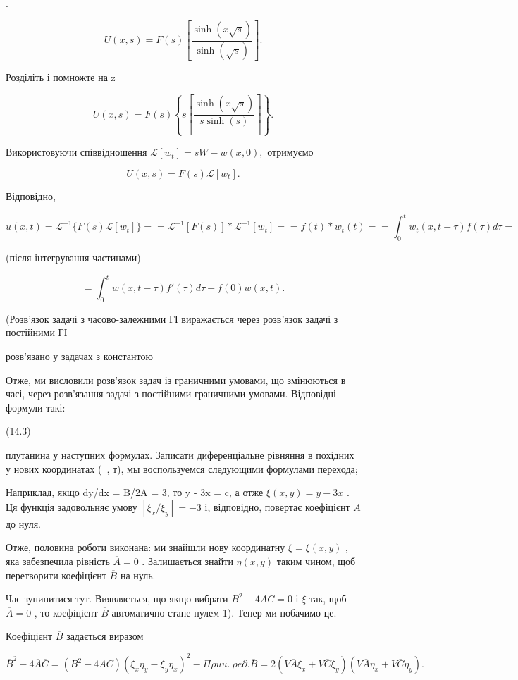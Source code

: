 \documentclass[
  ukrainian,
]{article}
\begin{document}
.

\[
U(x, s) = F(s) \left[ \frac{\sinh(x \sqrt{s})}{\sinh(\sqrt{s})} \right].
\]

Розділіть і помножте на z

\[
U(x, s) = F(s) \left\{ s \left[ \frac{\sinh(x \sqrt{s})}{s \sinh(s)} \right] \right\}.
\]

Використовуючи співвідношення \(\mathscr{L}[w_t] = sW - w(x, 0),\)
отримуємо

\[
U(x, s) = F(s) \mathcal{L}[w_t].
\]

Відповідно,

\[
u(x, t) = \mathcal{L}^{-1} \{ F(s) \mathcal{L}[w_t] \} =
= \mathcal{L}^{-1} [ F(s) ] * \mathcal{L}^{-1}[w_t] =
= f(t) * w_t(t) =
= \int_0^t w_t(x, t-\tau) f(\tau) d\tau =
\]

(після інтегрування частинами)

\[
= \int_{0}^{t} w(x, t-\tau) f'(\tau) d\tau + f(0) w(x, t).
\]

(Розв'язок задачі з часово-залежними ГІ виражається через розв'язок
задачі з постійними ГІ

розв'язано у задачах з константою

Отже, ми висловили розв'язок задач із граничними умовами, що змінюються
в часі, через розв'язання задачі з постійними граничними умовами.
Відповідні формули такі:

(14.3)

плутанина у наступних формулах. Записати диференціальне рівняння в
похідних у нових координатах (~, т), мы воспользуемся следующими
формулами перехода;

Наприклад, якщо dy/dx = B/2A = 3, то y - 3x = c, а отже
\(\xi(x, y) = y - 3x\) . Ця функція задовольняє умову
\([\xi_x/\xi_y] = -3\) і, відповідно, повертає коефіцієнт
\(\overline{A}\) до нуля.

Отже, половина роботи виконана: ми знайшли нову координатну
\(\xi = \xi(x, y)\) , яка забезпечила рівність \(\overline{A} = 0\) .
Залишається знайти \(\eta(x, y)\) таким чином, щоб перетворити
коефіцієнт \(\overline{B}\) на нуль.

Час зупинитися тут. Виявляється, що якщо вибрати \(B^2-4AC=0\) і \(\xi\)
так, щоб \(\overline{A}=0\) , то коефіцієнт \(\overline{B}\) автоматично
стане нулем 1). Тепер ми побачимо це.

Коефіцієнт \(\overline{B}\) задається виразом

\[
\overline{B}^2 - 4\overline{A}\overline{C} = (B^2 - 4AC) (\xi_x \eta_y - \xi_y \eta_x)^2 - \Pi \rho u u. \ \rho e \partial.
\overline{B} = 2 \left( V \overline{A} \xi_x + V \overline{C} \xi_y \right) \left( V \overline{A} \eta_x + V \overline{C} \eta_y \right).
\]
\end{document}
